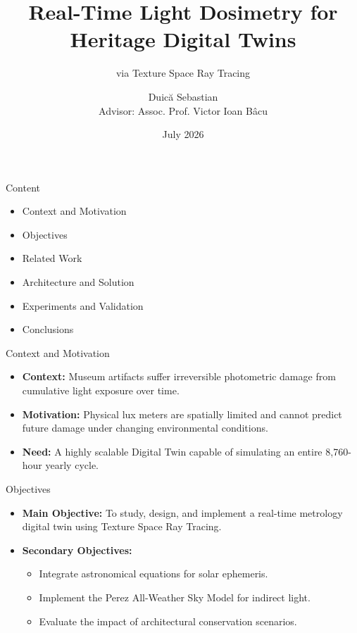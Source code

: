 \documentclass[aspectratio=169]{beamer}
\title{Real-Time Light Dosimetry for Heritage Digital Twins}
\subtitle{via Texture Space Ray Tracing}
\date{July 2026}
\author{Duică Sebastian \\ Advisor: Assoc. Prof. Victor Ioan Bâcu}
\institute{Technical University of Cluj-Napoca \\ Faculty of Automation and Computer Science}
\begin{document}
\begin{frame}
    \titlepage
\end{frame}

\begin{frame}{Content}
    \begin{itemize}
        \item Context and Motivation
        \item Objectives
        \item Related Work
        \item Architecture and Solution
        \item Experiments and Validation
        \item Conclusions
    \end{itemize}
\end{frame}

\begin{frame}{Context and Motivation}
    \begin{itemize}
        \item \textbf{Context:} Museum artifacts suffer irreversible photometric damage from cumulative light exposure over time.
        \item \textbf{Motivation:} Physical lux meters are spatially limited and cannot predict future damage under changing environmental conditions.
        \item \textbf{Need:} A highly scalable Digital Twin capable of simulating an entire 8,760-hour yearly cycle.
    \end{itemize}
\end{frame}

\begin{frame}{Objectives}
    \begin{itemize}
        \item \textbf{Main Objective:} To study, design, and implement a real-time metrology digital twin using Texture Space Ray Tracing.
        \item \textbf{Secondary Objectives:}
              \begin{itemize}
                  \item Integrate astronomical equations for solar ephemeris.
                  \item Implement the Perez All-Weather Sky Model for indirect light.
                  \item Evaluate the impact of architectural conservation scenarios.
              \end{itemize}
    \end{itemize}
\end{frame}
\end{document}
